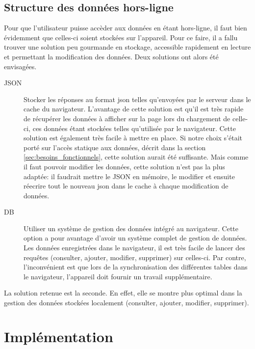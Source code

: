 \documentclass{EPL-master-thesis-covers-FR}
\begin{document}
		\section{Structure des données hors-ligne}
			\label{sec:data}
			Pour que l'utilisateur puisse accèder aux données en étant hors-ligne, il faut bien évidemment que celles-ci soient stockées sur l'appareil. Pour ce faire, il a fallu trouver une solution peu gourmande en stockage, accessible rapidement en lecture et permettant la modification des données. Deux solutions ont alors été envisagées.
			\begin{description}
				\item[JSON] Stocker les réponses au format \gls{json} telles qu'envoyées par le serveur dans le cache du navigateur. L'avantage de cette solution est qu'il est très rapide de récupérer les données à afficher sur la page lors du chargement de celle-ci, ces données étant stockées telles qu'utilisée par le navigateur. Cette solution est également très facile à mettre en place. Si notre choix s'était porté sur l'accès statique aux données, décrit dans la section \ref{sec:besoins_fonctionnels}, cette solution aurait été suffisante. Mais comme il faut pouvoir modifier les données, cette solution n'est pas la plus adaptée: il faudrait mettre le JSON en mémoire, le modifier et ensuite réecrire tout le nouveau \gls{json} dans le cache à chaque modification de données.
				\item[DB] Utiliser un système de gestion des données intégré au navigateur. Cette option a pour avantage d'avoir un système complet de gestion de données. Les données enregistrées dans le navigateur, il est très facile de lancer des requêtes (consulter, ajouter, modifier, supprimer) sur celles-ci. Par contre, l'inconvénient est que lors de la synchronisation des différentes tables dans le navigateur, l'appareil doit fournir un travail supplémentaire.
			\end{description}
				
			La solution retenue est la seconde. En effet, elle se montre plus optimal dans la gestion des données stockées localement (consulter, ajouter, modifier, supprimer).
			
			



	\chapter{Implémentation}
\end{document}
